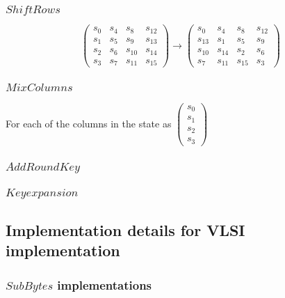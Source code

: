 \subsubsection{$ShiftRows$}

\begin{equation}
  \begin{pmatrix}
    s_0 & s_4 & s_8    & s_{12} \\
    s_1 & s_5 & s_9    & s_{13} \\
    s_2 & s_6 & s_{10} & s_{14} \\
    s_3 & s_7 & s_{11} & s_{15}
  \end{pmatrix} 
  \rightarrow
  \begin{pmatrix}
    s_0    & s_4    & s_8    & s_{12} \\
    s_{13} & s_1    & s_5    & s_9 \\
    s_{10} & s_{14} & s_2    & s_6 \\
    s_7    & s_{11} & s_{15} & s_3    
    \end{pmatrix}
\end{equation}

\subsubsection{$MixColumns$}

For each of the columns in the state as $
\begin{pmatrix}
  s_0\\s_1\\s_2\\s_3
\end{pmatrix}$

\subsubsection{$AddRoundKey$}

\subsubsection{$Key expansion$}


\subsection{Implementation details for VLSI implementation}

\subsubsection{$SubBytes$ implementations}

